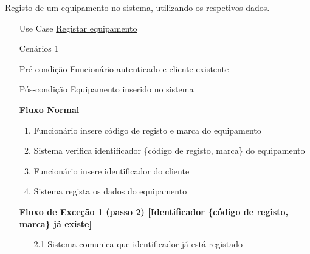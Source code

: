 \documentclass[../relatorio.tex]{subfiles}
\begin{document}
Registo de um equipamento no sistema, utilizando os respetivos dados.
\begin{itemize}
    \item[Use Case] {\underline{Registar equipamento}}
    \item[Cenários] {1}
    \item[Pré-condição] {Funcionário autenticado e cliente existente}
    \item[Pós-condição] {Equipamento inserido no sistema}
          \begin{flushleft}
              \textbf{Fluxo Normal}
          \end{flushleft}
          \begin{enumerate}
              \item Funcionário insere código de registo e marca do equipamento
              \item Sistema verifica identificador \{código de registo, marca\} do equipamento
              \item Funcionário insere identificador do cliente
              \item Sistema regista os dados do equipamento
          \end{enumerate}
          \begin{flushleft}
            \textbf{Fluxo de Exceção 1 (passo 2) [Identificador \{código de registo, marca\} já existe]}
        \end{flushleft}
        \begin{itemize}
            \item[2.1]{Sistema comunica que identificador já está registado}
        \end{itemize}
\end{itemize}
\end{document}
